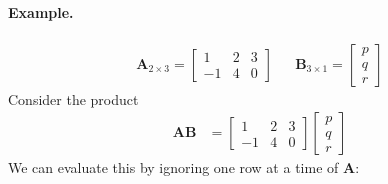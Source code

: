 \documentclass[11pt]{article}
\newcommand{\mat}[1]{\mathbf{#1}}
\begin{document}
\paragraph{Example.}
\begin{align*}
\mat{A}_{2 \times 3} = \begin{bmatrix}1 & 2 & 3 \\ -1 & 4 & 0\end{bmatrix}
&&
\mat{B}_{3 \times 1} = \begin{bmatrix}p\\q\\r\end{bmatrix}
\end{align*}
Consider the product
\begin{align*}
\mat{A} \mat{B} &= \begin{bmatrix}1 & 2 & 3 \\ -1 & 4 & 0\end{bmatrix}\begin{bmatrix}p\\q\\r\end{bmatrix}
\end{align*}
We can evaluate this by ignoring one row at a time of $\mat{A}$:
\end{document}
